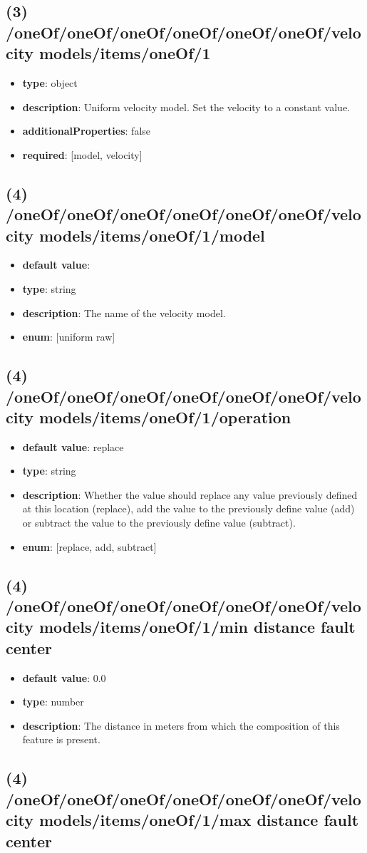 \subsection{(3) /oneOf/oneOf/oneOf/oneOf/oneOf/oneOf/velocity models/items/oneOf/1}
\begin{itemize}[leftmargin=3em]\item {\bf type}: object
\item {\bf description}: Uniform velocity model. Set the velocity to a constant value.
\item {\bf additionalProperties}: false
\item {\bf required}: [model, velocity]\end{itemize}
\subsection{(4) /oneOf/oneOf/oneOf/oneOf/oneOf/oneOf/velocity models/items/oneOf/1/model}
\begin{itemize}[leftmargin=4em]\item {\bf default value}: 
\item {\bf type}: string
\item {\bf description}: The name of the velocity model.
\item {\bf enum}: [uniform raw]\end{itemize}\subsection{(4) /oneOf/oneOf/oneOf/oneOf/oneOf/oneOf/velocity models/items/oneOf/1/operation}
\begin{itemize}[leftmargin=4em]\item {\bf default value}: replace
\item {\bf type}: string
\item {\bf description}: Whether the value should replace any value previously defined at this location (replace), add the value to the previously define value (add) or subtract the value to the previously define value (subtract).
\item {\bf enum}: [replace, add, subtract]\end{itemize}\subsection{(4) /oneOf/oneOf/oneOf/oneOf/oneOf/oneOf/velocity models/items/oneOf/1/min distance fault center}
\begin{itemize}[leftmargin=4em]\item {\bf default value}: 0.0
\item {\bf type}: number
\item {\bf description}: The distance in meters from which the composition of this feature is present.
\end{itemize}\subsection{(4) /oneOf/oneOf/oneOf/oneOf/oneOf/oneOf/velocity models/items/oneOf/1/max distance fault center}
